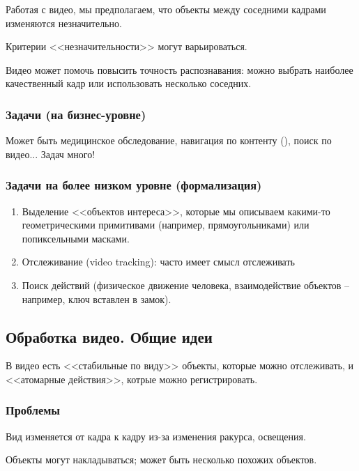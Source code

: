 \documentclass[main.tex]{subfiles}
\begin{document}
Работая с видео, мы предполагаем, что объекты между соседними кадрами изменяются незначительно.

Критерии <<незначительности>> могут варьироваться.

Видео может помочь повысить точность распознавания: можно выбрать наиболее качественный кадр или использовать несколько соседних.

\subsubsection{Задачи (на бизнес-уровне)}

Может быть медицинское обследование, навигация по контенту (), поиск по видео...
Задач много!

\subsubsection{Задачи на более низком уровне (формализация)}

\begin{enumerate}[noitemsep]
    \item Выделение <<объектов интереса>>, которые мы описываем какими-то геометрическими примитивами (например, прямоугольниками) или попиксельными масками.
    \item Отслеживание (video tracking): часто имеет смысл отслеживать
    \item Поиск действий (физическое движение человека, взаимодействие объектов -- например, ключ вставлен в замок).
\end{enumerate}

\subsection{Обработка видео. Общие идеи}

В видео есть <<стабильные по виду>> объекты, которые можно отслеживать, и <<атомарные действия>>, котрые можно регистрировать.

\subsubsection{Проблемы}

Вид изменяется от кадра к кадру из-за изменения ракурса, освещения.

Объекты могут накладываться; может быть несколько похожих объектов.
\end{document}
